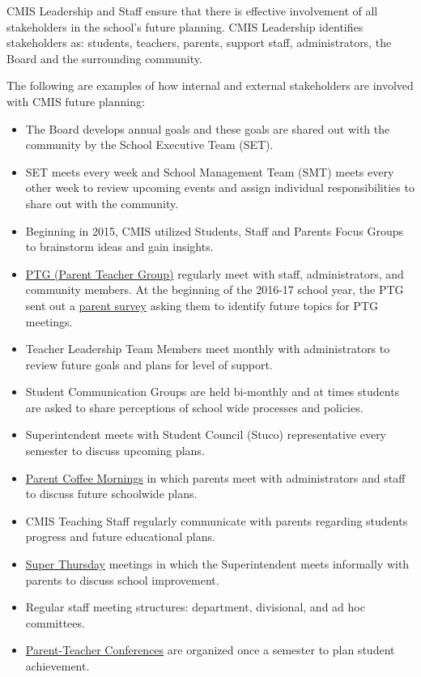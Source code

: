 \begin{findings}
CMIS Leadership and Staff ensure that there is effective involvement of all stakeholders in the school’s future planning. CMIS Leadership identifies stakeholders as: students, teachers, parents, support staff, administrators, the Board and the surrounding community. 

The following are examples of how internal and external stakeholders are involved with CMIS future planning: 

\begin{itemize}
\item The Board develops annual goals and these goals are shared out with the community by the School Executive Team (SET).
\item SET meets every week and School Management Team (SMT) meets every other week to review upcoming events and assign individual responsibilities to share out with the community.
\item Beginning in 2015, CMIS utilized Students, Staff and Parents Focus Groups to brainstorm ideas and gain insights. 
\item \href{https://www.facebook.com/cmis.th/photos/pcb.536310393230874/536309946564252/?type=3&theater}{PTG (Parent Teacher Group)} regularly meet with staff, administrators, and community members. At the beginning of the 2016-17 school year, the PTG sent out a \href{https://docs.google.com/document/d/1kiwakkg8eKdtEexCxVNx-m1CfC3VqxhukDy8WXDPGKY/edit?ts=58a2a142}{parent survey} asking them to identify future topics for PTG meetings.
\item Teacher Leadership Team Members meet monthly with administrators to review future goals and plans for level of support.
\item Student Communication Groups are held  bi-monthly and at times students are asked to share perceptions of school wide processes and policies. 
\item Superintendent meets with Student Council (Stuco) representative every semester to discuss upcoming plans.
\item \href{http://blogs.cmis.ac.th/ptg/2016/12/05/agenda-ptg-general-meeting-december-6th-2016/}{Parent Coffee Mornings} in which parents meet with administrators and staff to discuss future schoolwide plans. 
\item CMIS Teaching Staff regularly communicate with parents regarding students progress and future educational plans. 
\item \href{http://blogs.cmis.ac.th/newsletter/2016/09/05/super-thursdays-starts-this-week/}{Super Thursday} meetings in which the Superintendent meets informally with parents to discuss school improvement.  
\item Regular staff meeting structures: department, divisional,  and ad hoc committees. 
\item \href{https://drive.google.com/drive/folders/0B0TYmzaZNi3fRW56VWtIOGFLUFU?usp=sharing}{Parent-Teacher Conferences} are organized once a semester to plan student achievement. 
\end{itemize}


\end{findings}
